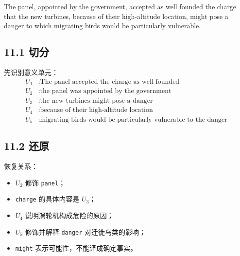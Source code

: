 \documentclass[11pt,a4paper]{ctexart}
\begin{document}
\begin{eng}[例 25：复杂句]
The panel, appointed by the government, accepted as well founded the charge that the new turbines, because of their high-altitude location, might pose a danger to which migrating birds would be particularly vulnerable.
\end{eng}

\subsection{11.1 切分}
先识别意义单元：
\[
\begin{aligned}
U_1 &: \text{The panel accepted the charge as well founded}\\
U_2 &: \text{the panel was appointed by the government}\\
U_3 &: \text{the new turbines might pose a danger}\\
U_4 &: \text{because of their high-altitude location}\\
U_5 &: \text{migrating birds would be particularly vulnerable to the danger}
\end{aligned}
\]

\subsection{11.2 还原}
恢复关系：
\begin{itemize}
  \item $U_2$ 修饰 \texttt{panel}；
  \item \texttt{charge} 的具体内容是 $U_3$；
  \item $U_4$ 说明涡轮机构成危险的原因；
  \item $U_5$ 修饰并解释 \texttt{danger} 对迁徙鸟类的影响；
  \item \texttt{might} 表示可能性，不能译成确定事实。
\end{itemize}

\begin{center}
\end{center}
\end{document}
